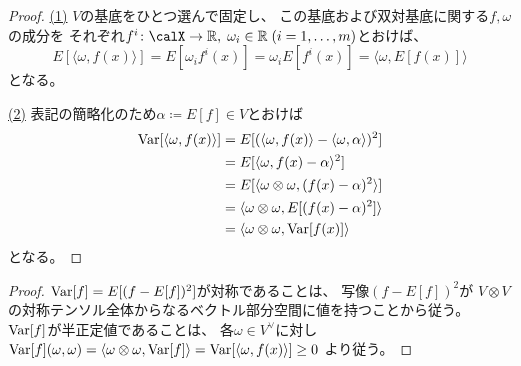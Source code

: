 \documentclass[report]{jlreq}
\begin{document}
\begin{proof}
    \uline{(1)} \quad
    $V$の基底をひとつ選んで固定し、
    この基底および双対基底に関する$f, \omega$の成分を
    それぞれ$f^i \colon \calX \to \R, \; \omega_i \in \R \; (i = 1, \dots, m)$とおけば、
    \begin{equation}
        E[\langle \omega, f(x) \rangle]
            =
                E[\omega_i f^i(x)]
            =
                \omega_i E[f^i(x)]
            = \langle \omega, E[f(x)] \rangle
    \end{equation}
    となる。

    \uline{(2)} \quad
    表記の簡略化のため$\alpha \coloneqq E[f] \in V$とおけば
    \begin{alignat}{1}
        \operatorname{Var}[\langle \omega, f(x) \rangle]
            &=
                E[(\langle \omega, f(x) \rangle - \langle \omega, \alpha \rangle)^2]
                \\
            &=
                E[\langle \omega, f(x) - \alpha \rangle^2]
                \\
            &=
                E[
                    \langle
                        \omega \otimes \omega,
                        (f(x) - \alpha)^2
                    \rangle
                ]
                \\
            &=
                \langle
                    \omega \otimes \omega,
                    E[(f(x) - \alpha)^2]
                \rangle
                \\
            &=
                \langle
                    \omega \otimes \omega,
                    \operatorname{Var}[f(x)]
                \rangle
    \end{alignat}
    となる。
\end{proof}


\begin{proof}
    $\operatorname{Var}[f] = E[(f - E[f])^2]$が対称であることは、
    写像$(f - E[f])^2$が
    $V \otimes V$の対称テンソル全体からなるベクトル部分空間に値を持つことから従う。
    $\operatorname{Var}[f]$が半正定値であることは、
    各$\omega \in V^\vee$に対し
    $\operatorname{Var}[f](\omega, \omega)
        = \langle \omega \otimes \omega, \operatorname{Var}[f] \rangle
        = \operatorname{Var}[\langle \omega, f(x) \rangle]
        \ge 0$
    より従う。
\end{proof}
\end{document}
